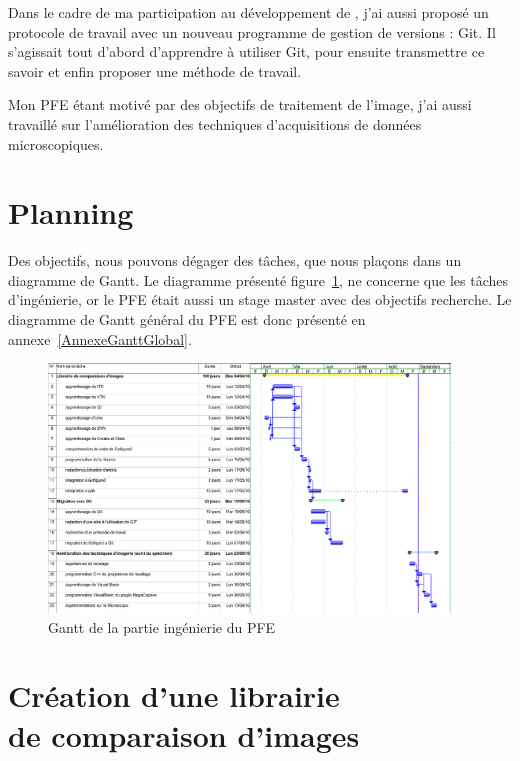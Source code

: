 Dans le cadre de ma participation au développement de \gofigure,
 j'ai aussi proposé un protocole de travail avec un nouveau programme de gestion de versions : Git.
 Il s'agissait tout d'abord d'apprendre à utiliser Git, pour ensuite transmettre ce savoir et enfin proposer une méthode de travail.

Mon PFE étant motivé par des objectifs de traitement de l'image, j'ai aussi travaillé sur l'amélioration
 des techniques d'acquisitions de données microscopiques.
 
 
\section*{Planning} 
 
Des objectifs, nous pouvons dégager des tâches, que nous plaçons dans un diagramme de Gantt. Le diagramme présenté figure~\ref{fig:GanttPFEInge}, ne concerne que les tâches d'ingénierie, or le PFE était aussi un stage master avec des objectifs recherche. Le diagramme de Gantt général du PFE est donc présenté en annexe~\ref{AnnexeGanttGlobal}.
 
\begin{figure}[h]
\begin{center}
\leavevmode
\includegraphics[angle=-90, width=0.95\textwidth]{pictures/GanttPFEInge}
\end{center}
\caption{Gantt de la partie ingénierie du PFE}
\label{fig:GanttPFEInge}
\end{figure}



\section{Création d'une librairie \\ de comparaison d'images}

